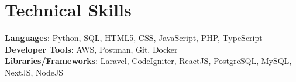 \documentclass[letterpaper,11pt]{article}
\begin{document}
\section{Technical Skills}
 \begin{itemize}[leftmargin=0.15in, label={}]
    \small{\item{   
     \textbf{Languages}{: Python, SQL, HTML5, CSS, JavaScript, PHP, TypeScript} ~\\[1mm]
     \textbf{Developer Tools}{: AWS, Postman, Git, Docker} ~\\[1mm]
     \textbf{Libraries/Frameworks}{: Laravel, CodeIgniter, ReactJS, PostgreSQL, MySQL, NextJS, NodeJS} ~\\[1mm]
    }}
 \end{itemize}
 \vspace{-16pt}
 \vspace{3pt}
\vspace{10pt}

\vspace{-15pt}
\end{document}
